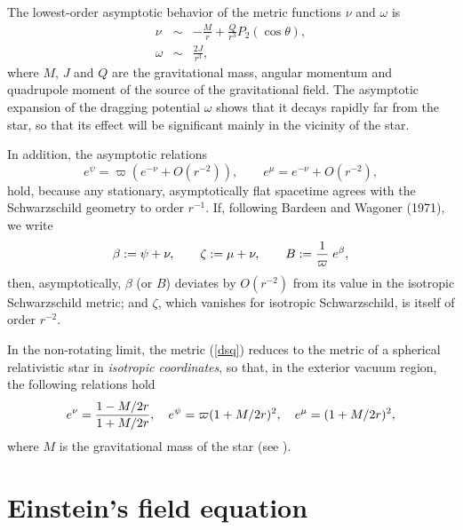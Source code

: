 \documentclass[12pt]{article}
\def\be{\begin{equation}}
\def\ee{\end{equation}}
\begin{document}
\vskip0.8cm

The lowest-order asymptotic behavior of the metric functions $\nu$
and $\omega$ is
\begin{eqnarray}
\nu &\sim& -\frac{M}{r} +\frac{Q}{r^3}P_2(\cos \theta), \label{nuatr}
\\
\omega&\sim&\frac{2J}{r^3},
\end{eqnarray}
where $M$, $J$ and $Q$ are the gravitational mass, angular momentum
and quadrupole moment of the source of the gravitational field. The asymptotic expansion of
the dragging potential $\omega$ shows that it decays rapidly far from
the star, so that its effect will be significant mainly in the
vicinity of the star.

In addition, the asymptotic relations
\be
e^{\psi} = \varpi (e^{-\nu} + O(r^{-2})), \qquad
 e^{\mu} = e^{-\nu} + O(r^{-2}), \label{asymp}
\ee
hold, because any stationary, asymptotically flat spacetime agrees with
the Schwarzschild geometry to order $r^{-1}$.  If, following
Bardeen and Wagoner (1971), we write
\be
\beta := \psi + \nu , \qquad \zeta := \mu + \nu ,  \qquad 
        B := {1\over\varpi} \; e^\beta, \label{Bzeta}
\ee
then, asymptotically, $\beta$ (or $B$) deviates by $O(r^{-2})$ from
its value in the isotropic Schwarz\-schild metric; and $\zeta$,
which vanishes for isotropic Schwarzschild, is itself of order $r^{-2}$.

\vskip0.8cm

In the non-rotating limit, the metric (\ref{dsq}) reduces to the
metric of a spherical relativistic star in {\it isotropic
  coordinates}, so that, in the exterior vacuum region, the following
  relations hold
\be
e^{\nu} = {1-M/2r\over{1+M/2r}} , \quad e^{\psi} = \varpi (1+M/2r)^2 ,
\quad e^{\mu} = (1+M/2r)^2,  \label{pots}
\ee
where $M$ is the gravitational mass of the star (see 
\cite{Weinberg72}).

%
%

\vskip0.8cm




\section{Einstein's field equation}
\end{document}
